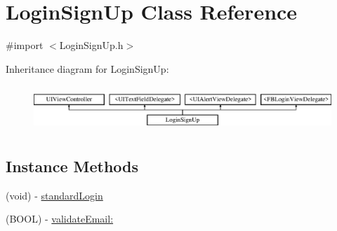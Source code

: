 \hypertarget{interface_login_sign_up}{\section{Login\+Sign\+Up Class Reference}
\label{interface_login_sign_up}
}


{\ttfamily \#import $<$Login\+Sign\+Up.\+h$>$}

Inheritance diagram for Login\+Sign\+Up\+:\begin{figure}[H]
\begin{center}
\leavevmode
\includegraphics[height=1.761006cm]{interface_login_sign_up}
\end{center}
\end{figure}
\subsection*{Instance Methods}
\begin{DoxyCompactItemize}
\item 
(void) -\/ \hyperlink{interface_login_sign_up_a648321618c03b2f173a983524db03493}{standard\+Login}
\item 
(B\+O\+O\+L) -\/ \hyperlink{interface_login_sign_up_ae3df154525f230ce1e5575d2d10840e2}{validate\+Email\+:}
\end{DoxyCompactItemize}
